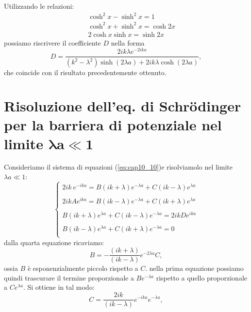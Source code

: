 \documentclass[a4paper,12pt,twoside]{book}
\begin{document}
Utilizzando le relazioni:
\begin{eqnarray}
& &\cosh ^2 x - \sinh ^2 x=1 \nonumber \\
& &\cosh ^2 x + \sinh ^2 x=\cosh 2x  \\
& &2 \cosh  x \sinh  x=\sinh 2x \nonumber 
\end{eqnarray}
possiamo riscrivere il coefficiente $D$ nella forma
\begin{equation}
D=\frac{2ik\lambda e^{-2ika}}{\left(k^2-\lambda^2\right)\sinh \left(2\lambda a\right)+2ik\lambda \cosh\left(2\lambda a\right)},
\end{equation}
che coincide con il risultato precedentemente ottenuto.
\section{Risoluzione dell'eq. di Schr\"{o}dinger per la barriera di potenziale nel limite $\mathbf{\lambda a \ll 1}$}
Consideriamo il sistema di equazioni (\ref{eq:cap10_10})e risolviamolo nel limite $\lambda a \ll 1$:
\begin{equation}
\begin{cases}
\displaystyle{2ik\ e^{-ika}=B\left( ik+\lambda\right)e^{-\lambda a} + C\left( ik-\lambda\right)e^{\lambda a}}\\
\\
\displaystyle{2ikA e^{ika}=B\left( ik-\lambda\right)e^{-\lambda a} + C\left( ik+\lambda\right)e^{\lambda a}}\\
\\
\displaystyle{B\left( ik+\lambda\right)e^{\lambda a} + C\left( ik-\lambda\right)e^{-\lambda a}}= 2ikD e^{ika}\\
\\
\displaystyle{B\left( ik-\lambda\right)e^{\lambda a} + C\left( ik+\lambda\right)e^{-\lambda a}}= 0\\
\end{cases}
\end{equation} 
dalla quarta equazione ricaviamo:
\begin{equation}
B=-\frac{(ik+\lambda)}{(ik-\lambda)}e^{-2 \lambda a } C,
\end{equation}
ossia $B$ è esponenzialmente piccolo rispetto a $C$.  nella prima equazione possiamo quindi trascurare il termine proporzionale a $Be^{-\lambda a}$ rispetto a quello proporzionale a $Ce^{\lambda a }$. Si ottiene in tal modo:
\begin{equation}
C= \frac{2ik}{(ik-\lambda)}e^{-ika}e^{-\lambda a},
\end{equation}
\end{document}
